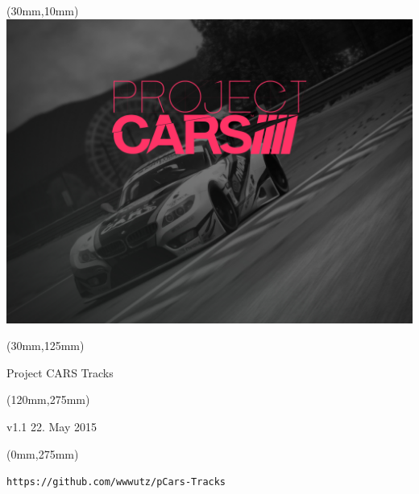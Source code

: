 \documentclass[oneside, a4paper, 12pt]{book}
\begin{document}
\selectfont
\textblockorigin{0cm}{0cm}

\newlength{\Logo}
\setlength{\Logo}{210mm-60mm}
\begin{textblock*}{\Logo}(30mm,10mm)%
\includegraphics[width=\Logo]{pcars-main.png}
\end{textblock*}

\begin{textblock*}{\Logo}(30mm,125mm)%
\begin{center}\Huge{Project CARS Tracks}\end{center}
\end{textblock*}

\begin{textblock*}{90mm}(120mm,275mm)%
\begin{center}\Huge{v1.1 22. May 2015}\end{center}
\end{textblock*}

\begin{textblock*}{90mm}(0mm,275mm)%
\begin{center}\tt{https://github.com/wwwutz/pCars-Tracks}\end{center}
\end{textblock*}



\end{document}
